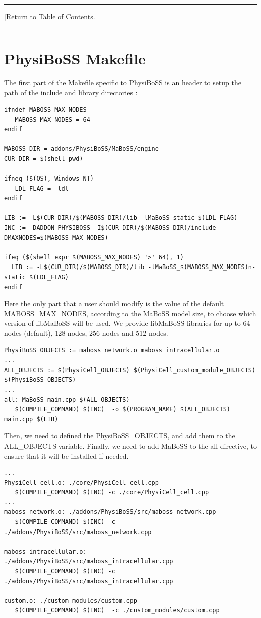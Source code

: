 \documentclass[12pt]{article}
\newcommand{\TOClink}{\begin{center}\hrule\vskip-5pt\phantom{.}\hfill[Return to \hyperlink{TOC}{Table of Contents}.]\hfill\phantom{.}\vskip3pt\hrule\end{center}}
\begin{document}
\TOClink


\section{PhysiBoSS Makefile}
\label{sec:physiboss_makefile}

The first part of the Makefile specific to PhysiBoSS is an header to setup the path of the include and library directories : 

\begin{verbatim}
ifndef MABOSS_MAX_NODES
   MABOSS_MAX_NODES = 64
endif

MABOSS_DIR = addons/PhysiBoSS/MaBoSS/engine
CUR_DIR = $(shell pwd)

ifneq ($(OS), Windows_NT)
   LDL_FLAG = -ldl
endif

LIB := -L$(CUR_DIR)/$(MABOSS_DIR)/lib -lMaBoSS-static $(LDL_FLAG)
INC := -DADDON_PHYSIBOSS -I$(CUR_DIR)/$(MABOSS_DIR)/include -DMAXNODES=$(MABOSS_MAX_NODES)

ifeq ($(shell expr $(MABOSS_MAX_NODES) '>' 64), 1)
  LIB := -L$(CUR_DIR)/$(MABOSS_DIR)/lib -lMaBoSS_$(MABOSS_MAX_NODES)n-static $(LDL_FLAG)
endif
\end{verbatim}
Here the only part that a user should modify is the value of the default MABOSS\_MAX\_NODES, according to the MaBoSS model size, to choose which version of libMaBoSS will be used. We provide libMaBoSS libraries for up to 64 nodes (default), 128 nodes, 256 nodes and 512 nodes. 
 
\begin{verbatim}
PhysiBoSS_OBJECTS := maboss_network.o maboss_intracellular.o
...
ALL_OBJECTS := $(PhysiCell_OBJECTS) $(PhysiCell_custom_module_OBJECTS) $(PhysiBoSS_OBJECTS)
...
all: MaBoSS main.cpp $(ALL_OBJECTS)
   $(COMPILE_COMMAND) $(INC)  -o $(PROGRAM_NAME) $(ALL_OBJECTS) main.cpp $(LIB)
\end{verbatim}

Then, we need to defined the PhysiBoSS\_OBJECTS, and add them to the ALL\_OBJECTS variable. Finally, we need to add MaBoSS to the all directive, to ensure that it will be installed if needed. 

\begin{verbatim}
...
PhysiCell_cell.o: ./core/PhysiCell_cell.cpp
   $(COMPILE_COMMAND) $(INC) -c ./core/PhysiCell_cell.cpp 
...
maboss_network.o: ./addons/PhysiBoSS/src/maboss_network.cpp
   $(COMPILE_COMMAND) $(INC) -c ./addons/PhysiBoSS/src/maboss_network.cpp

maboss_intracellular.o: ./addons/PhysiBoSS/src/maboss_intracellular.cpp
   $(COMPILE_COMMAND) $(INC) -c ./addons/PhysiBoSS/src/maboss_intracellular.cpp

custom.o: ./custom_modules/custom.cpp 
   $(COMPILE_COMMAND) $(INC)  -c ./custom_modules/custom.cpp

\end{verbatim}
\end{document}
